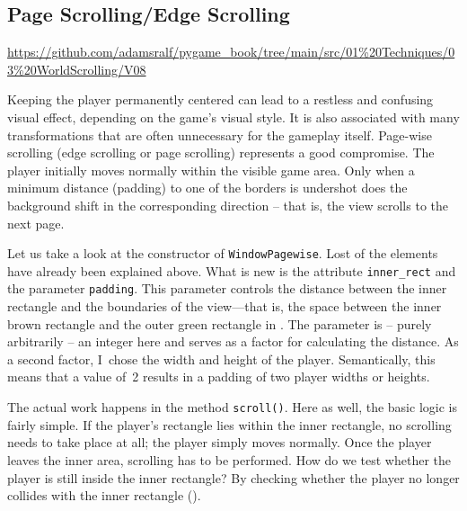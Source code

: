 

\newpage
\subsection{Page Scrolling/Edge Scrolling}
\begin{diskbox}
	\url{https://github.com/adamsralf/pygame_book/tree/main/src/01%20Techniques/03%20WorldScrolling/V08}
\end{diskbox}
Keeping the player permanently centered can lead to a restless and confusing visual effect, depending on the game’s visual style. It is also associated with many transformations that are often unnecessary for the gameplay itself. Page-wise scrolling (edge scrolling or page scrolling) represents a good compromise. The player initially moves normally within the visible game area. Only when a minimum distance (\gls{padding}) to one of the borders is undershot does the background shift in the corresponding direction -- that is, the view scrolls to the next page.

Let us take a look at the constructor of \texttt{WindowPagewise}. Lost of the elements have already been explained above. What is new is the attribute \texttt{inner\_rect} and the parameter \texttt{padding}. This parameter controls the distance between the inner rectangle and the boundaries of the view—that is, the space between the inner brown rectangle and the outer green rectangle in . The parameter is -- purely arbitrarily -- an integer here and serves as a factor for calculating the distance. As a second factor, I~chose the width and height of the player. Semantically, this means that a value of~2 results in a padding of two player widths or heights.


The actual work happens in the method \texttt{scroll()}. Here as well, the basic logic is fairly simple. If the player’s rectangle lies within the inner rectangle, no scrolling needs to take place at all; the player simply moves normally. Once the player leaves the inner area, scrolling has to be performed.   How do we test whether the player is still inside the inner rectangle? By checking whether the player no longer collides with the inner rectangle ().

